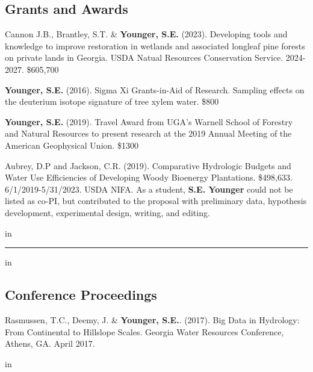 \documentclass[10pt,letterpaper]{article}
\begin{document}
	\subsection*{Grants and Awards}
	
	\begin{hangparas}{.25in}{1}
		
		Cannon J.B., Brantley, S.T. \& \textbf{Younger, S.E.} (2023). Developing tools and knowledge to improve restoration in wetlands and associated longleaf pine forests on private lands in Georgia. USDA Natual Resources Conservation Service. 2024-2027. \$605,700
		
		\textbf{Younger, S.E.} (2016). Sigma Xi Grants-in-Aid of Research. Sampling effects on the deuterium isotope signature of tree xylem water. \$800
		
		\textbf{Younger, S.E.} (2019). Travel Award from UGA's Warnell School of Forestry and Natural Resources to present research at the 2019 Annual Meeting of the American Geophysical Union. \$1300
		
		Aubrey, D.P and Jackson, C.R. (2019). Comparative Hydrologic Budgets and Water Use Efficiencies of Developing Woody Bioenergy Plantations. \$498,633. 6/1/2019-5/31/2023. USDA NIFA. As a student, \textbf{S.E. Younger} could not be listed as co-PI, but contributed to the proposal with preliminary data, hypothesis development, experimental design, writing, and editing.
		
		\vspace{-0.4em}
		 in
		
	\end{hangparas}
	
	\hrule
	\vspace{-0.4em}
	 in
	\subsection*{Conference Proceedings}
	
	\begin{hangparas}{.25in}{1}
		
		Rasmussen, T.C., Deemy, J. \& \textbf{Younger, S.E.}. (2017). Big Data in Hydrology: From Continental to Hillslope Scales. Georgia Water Resources Conference, Athens, GA. April 2017.
		
	\end{hangparas}
	
	 in
	
	
\end{document}
